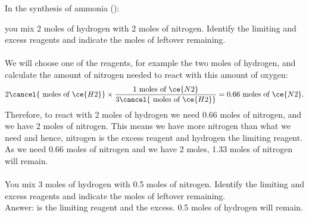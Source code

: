 \documentclass[main.tex]{subfiles}
\begin{document}
\begin{description}
\begin{example} %
In the synthesis of ammonia ():
\begin{center}  \end{center}
you mix 2 moles of hydrogen with 2 moles of nitrogen. Identify the limiting and excess reagents and indicate the moles of leftover remaining.\\
\\
We will choose one of the reagents, for example the two moles of hydrogen, and calculate the amount of nitrogen needed to react with this amount of oxygen:
\begin{equation*}
2\cancel{\text{ moles of }\ce{H2}} \times \dfrac{\text{1 moles of }\ce{N2}}{3\cancel{\text{ moles of }\ce{H2}}}=0.66\text{ moles of }\ce{N2}.
\end{equation*}
Therefore, to react with 2 moles of hydrogen we need 0.66 moles of nitrogen, and we have 2 moles of nitrogen. This means we have more nitrogen than what we need and hence, nitrogen is the excess reagent and hydrogen the limiting reagent. As we need 0.66 moles of nitrogen and we have 2 moles, 1.33 moles of nitrogen will remain.
\\
\faDiamond\ \\
You mix 3 moles of hydrogen with 0.5 moles of nitrogen. Identify the limiting and excess reagents and indicate the moles of leftover remaining. \\
\flushright Answer:  is the limiting reagent and  the excess. 0.5 moles of hydrogen will remain.
\end{example}%

\end{description}
\end{document}
